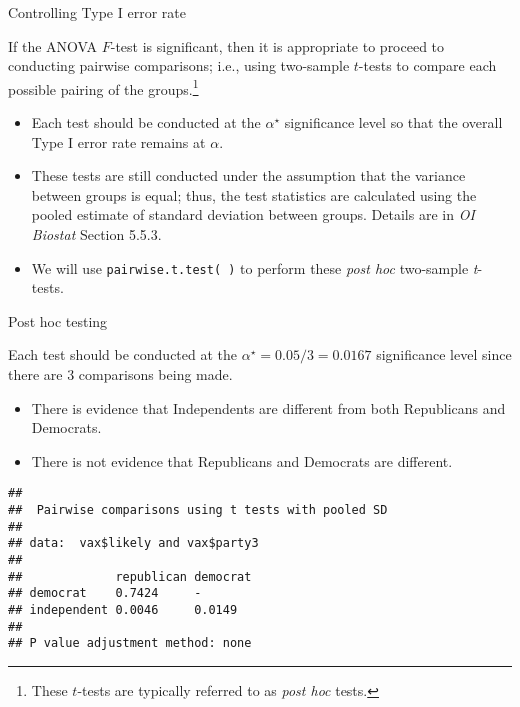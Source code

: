 \documentclass[
  ignorenonframetext,
  aspectratio=169]{beamer}
\newenvironment{Shaded}{\begin{snugshade}}{\end{snugshade}}
\newcommand{\AttributeTok}[1]{\textcolor[rgb]{0.13,0.29,0.53}{#1}}
\newcommand{\FunctionTok}[1]{\textcolor[rgb]{0.13,0.29,0.53}{\textbf{#1}}}
\newcommand{\NormalTok}[1]{#1}
\newcommand{\SpecialCharTok}[1]{\textcolor[rgb]{0.81,0.36,0.00}{\textbf{#1}}}
\newcommand{\StringTok}[1]{\textcolor[rgb]{0.31,0.60,0.02}{#1}}
\begin{document}
\begin{frame}{Controlling Type I error rate}
\protect\hypertarget{controlling-type-i-error-rate}{}
\small

If the ANOVA \(F\)-test is significant, then it is appropriate to
proceed to conducting pairwise comparisons; i.e., using two-sample
\(t\)-tests to compare each possible pairing of the
groups.\footnote{These $t$-tests are typically referred to as \textit{post hoc} tests.}

\begin{itemize}
\item
  Each test should be conducted at the \(\alpha^\star\) significance
  level so that the overall Type I error rate remains at \(\alpha\).
\item
  These tests are still conducted under the assumption that the variance
  between groups is equal; thus, the test statistics are calculated
  using the pooled estimate of standard deviation between groups.
  Details are in \emph{OI Biostat} Section 5.5.3.
\item
  We will use \texttt{pairwise.t.test( )} to perform these \emph{post
  hoc} two-sample \emph{t}-tests.
\end{itemize}
\end{frame}

\begin{frame}[fragile]{Post hoc testing}
\protect\hypertarget{post-hoc-testing}{}
\small

Each test should be conducted at the \(\alpha^\star = 0.05/3 = 0.0167\)
significance level since there are 3 comparisons being made.

\begin{itemize}
\item
  There is evidence that Independents are different from both
  Republicans and Democrats.
\item
  There is not evidence that Republicans and Democrats are different.
\end{itemize}

\scriptsize

\begin{Shaded}
\end{Shaded}

\begin{verbatim}
## 
##  Pairwise comparisons using t tests with pooled SD 
## 
## data:  vax$likely and vax$party3 
## 
##             republican democrat
## democrat    0.7424     -       
## independent 0.0046     0.0149  
## 
## P value adjustment method: none
\end{verbatim}
\end{frame}
\end{document}

